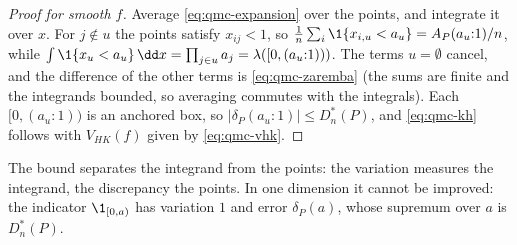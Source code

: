 \begin{proof}[Proof for smooth $f$]
Average \eqref{eq:qmc-expansion} over the points, and integrate it over $x$. For
$j\notin u$ the points satisfy $x_{ij}<1$, so $\frac1n\sum_i\1\{x_{i,u}<a_u\}=A_P(a_u{:}1)/n$,
while $\int\1\{x_u<a_u\}\,\dd x=\prod_{j\in u}a_j=\lambda([0,(a_u{:}1)))$. The terms $u=\emptyset$
cancel, and the difference of the other terms is \eqref{eq:qmc-zaremba} (the sums are
finite and the integrands bounded, so averaging commutes with the integrals). Each
$[0,(a_u{:}1))$ is an anchored box, so $|\delta_P(a_u{:}1)|\le D^*_n(P)$, and
\eqref{eq:qmc-kh} follows with $V_{HK}(f)$ given by \eqref{eq:qmc-vhk}.
\end{proof}

The bound separates the integrand from the points: the variation measures the integrand,
the discrepancy the points. In one dimension it cannot be improved: the indicator
$\1_{[0,a)}$ has variation $1$ and error $\delta_P(a)$, whose supremum over $a$ is
$D^*_n(P)$.

